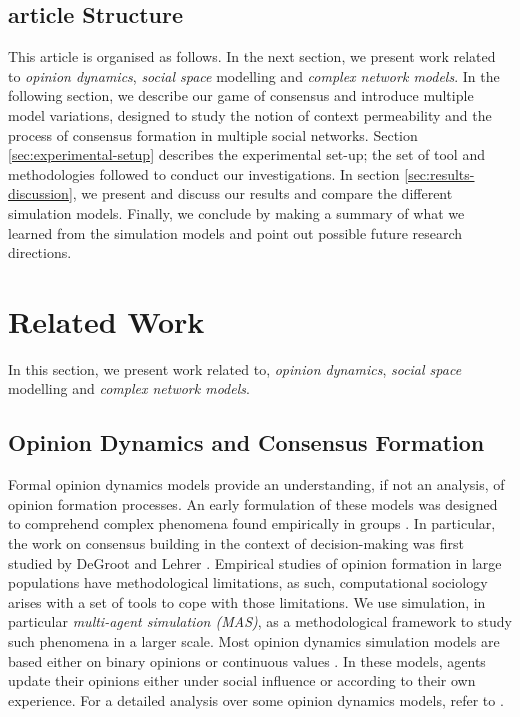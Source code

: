 \documentclass[preprint,number]{elsarticle}
\begin{document}
	\subsection{article Structure}
\noindent This article is organised as follows. In the next section, we present work related to \textit{opinion dynamics}, \textit{social space} modelling and \textit{complex network models}. In the following section, we describe our game of consensus and introduce multiple model variations, designed to study the notion of context permeability and the process of consensus formation in multiple social networks. Section \ref{sec:experimental-setup} describes the experimental set-up; the set of tool and methodologies followed to conduct our investigations. In section \ref{sec:results-discussion}, we present and discuss our results and compare the different simulation models. Finally, we conclude by making a summary of what we learned from the simulation models and point out possible future research directions.
	
	\section{Related Work}
	\label{sec:relatedwork}
\noindent In this section, we present work related to, \textit{opinion dynamics}, \textit{social space} modelling and \textit{complex network models}.	
	\subsection{Opinion Dynamics and Consensus Formation}
\noindent Formal opinion dynamics models provide an understanding, if not an analysis, of opinion formation processes.  An early formulation of these models was designed to comprehend complex phenomena found empirically in groups \cite{French1956}. In particular, the work on consensus building in the context of decision-making was first studied by DeGroot \cite{Degroot74} and Lehrer \cite{Lehrer1975}. Empirical studies of opinion formation in large populations have methodological limitations, as such, computational sociology arises with a set of tools to cope with those limitations. We use simulation, in particular \textit{multi-agent simulation (MAS)}, as a methodological framework to study such phenomena in a larger scale. Most opinion dynamics simulation models are based either on binary opinions \cite{Galam1997,Antunes2009} or continuous values \cite{Deffuant2000,Deffuant2002}. In these models, agents update their opinions either under social influence or according to their own experience. For a detailed analysis over some opinion dynamics models, refer to \cite{Hegselmann2002}. 
	
\end{document}
